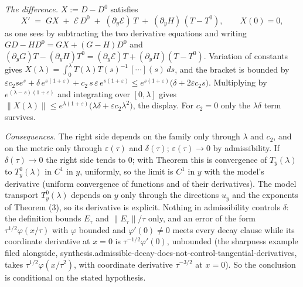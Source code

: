 \emph{The difference.} $X := D - D^{0}$ satisfies
\[
X' \;=\; G X \;+\; \mathcal{E}\,D^{0} \;+\; (\partial_{y}\mathcal{E})\,T \;+\; (\partial_{y}H)\,(T - T^{0}), \qquad X(0) = 0,
\]
as one sees by subtracting the two derivative equations and writing $G D - H D^{0} = G X + (G - H)D^{0}$ and $(\partial_{y}G)T - (\partial_{y}H)T^{0} = (\partial_{y}\mathcal{E})T + (\partial_{y}H)(T - T^{0})$. Variation of constants gives $X(\lambda) = \int_{0}^{\lambda}T(\lambda)T(s)^{-1}\,[\cdots](s)\,ds$, and the bracket is bounded by $\varepsilon c_{2}s e^{s} + \delta\,e^{s(1+\varepsilon)} + c_{2}\,s\,\varepsilon\,e^{s(1+\varepsilon)} \le e^{s(1+\varepsilon)}\bigl(\delta + 2\varepsilon c_{2}s\bigr)$. Multiplying by $e^{(\lambda - s)(1+\varepsilon)}$ and integrating over $[0, \lambda]$ gives $\|X(\lambda)\| \le e^{\lambda(1+\varepsilon)}\bigl(\lambda\delta + \varepsilon c_{2}\lambda^{2}\bigr)$, the display. For $c_{2} = 0$ only the $\lambda\delta$ term survives.

\emph{Consequences.} The right side depends on the family only through $\lambda$ and $c_{2}$, and on the metric only through $\varepsilon(\tau)$ and $\delta(\tau)$; $\varepsilon(\tau) \to 0$ by admissibility. If $\delta(\tau) \to 0$ the right side tends to $0$; with Theorem  this is convergence of $T_{y}(\lambda)$ to $T^{0}_{y}(\lambda)$ in $C^{1}$ in $y$, uniformly, so the limit is $C^{1}$ in $y$ with the model's derivative (uniform convergence of functions and of their derivatives). The model transport $T^{0}_{y}(\lambda)$ depends on $y$ only through the directions $u_{y}$ and the exponents of Theorem (3), so its derivative is explicit. Nothing in admissibility controls $\delta$: the definition bounds $E_{\tau}$ and $\|E_{\tau}\|/\tau$ only, and an error of the form $\tau^{1/2}\varphi(x/\tau)$ with $\varphi$ bounded and $\varphi'(0) \ne 0$ meets every decay clause while its coordinate derivative at $x = 0$ is $\tau^{-1/2}\varphi'(0)$, unbounded (the sharpness example filed alongside, synthesis.admissible-decay-does-not-control-tangential-derivatives, takes $\tau^{1/2}\varphi(x/\tau^{2})$, with coordinate derivative $\tau^{-3/2}$ at $x = 0$). So the conclusion is conditional on the stated hypothesis.

